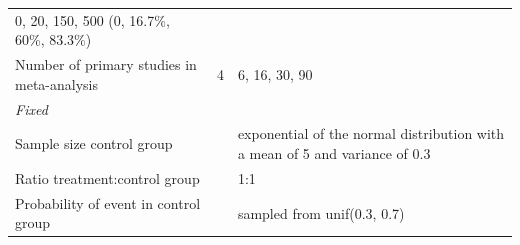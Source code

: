 \documentclass[
  english,
  doc,floatsintext,draftall]{apa6}
\begin{document}
\begin{longtable}[]{@{}lll@{}}
\begin{minipage}[t]{0.43\columnwidth}
0, 20, 150, 500 (0, 16.7\%, 60\%, 83.3\%)\strut
\end{minipage}\tabularnewline
\begin{minipage}[t]{0.37\columnwidth}\raggedright
Number of primary studies in meta-analysis\strut
\end{minipage} & \begin{minipage}[t]{0.12\columnwidth}\raggedright
4\strut
\end{minipage} & \begin{minipage}[t]{0.43\columnwidth}\raggedright
6, 16, 30, 90\strut
\end{minipage}\tabularnewline
\begin{minipage}[t]{0.37\columnwidth}\raggedright
\emph{Fixed}\strut
\end{minipage} & \begin{minipage}[t]{0.12\columnwidth}\raggedright
\strut
\end{minipage} & \begin{minipage}[t]{0.43\columnwidth}\raggedright
\strut
\end{minipage}\tabularnewline
\begin{minipage}[t]{0.37\columnwidth}\raggedright
Sample size control group\strut
\end{minipage} & \begin{minipage}[t]{0.12\columnwidth}\raggedright
\strut
\end{minipage} & \begin{minipage}[t]{0.43\columnwidth}\raggedright
exponential of the normal distribution with a mean of 5 and variance of 0.3\strut
\end{minipage}\tabularnewline
\begin{minipage}[t]{0.37\columnwidth}\raggedright
Ratio treatment:control group\strut
\end{minipage} & \begin{minipage}[t]{0.12\columnwidth}\raggedright
\strut
\end{minipage} & \begin{minipage}[t]{0.43\columnwidth}\raggedright
1:1\strut
\end{minipage}\tabularnewline
\begin{minipage}[t]{0.37\columnwidth}\raggedright
Probability of event in control group\strut
\end{minipage} & \begin{minipage}[t]{0.12\columnwidth}\raggedright
\strut
\end{minipage} & \begin{minipage}[t]{0.43\columnwidth}\raggedright
sampled from unif(0.3, 0.7)\strut
\end{minipage}\tabularnewline
\bottomrule
\end{longtable}
\end{document}
